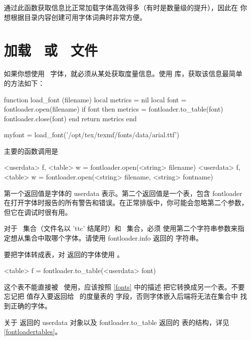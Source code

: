 通过此函数获取信息比正常加载字体高效得多（有时是数量级的提升），因此在
你想根据目录内容创建可用字体词典时非常方便。

\section{加载 \OPENTYPE\ 或 \TRUETYPE\ 文件}

\topicindex {\OPENTYPE}
\topicindex {\TRUETYPE}


如果你想使用 \OPENTYPE\ 字体，就必须从某处获取度量信息。使用
 库，获取该信息最简单的方法如下：

\begin{typing}
function load_font (filename)
  local metrics = nil
  local font = fontloader.open(filename)
  if font then
     metrics = fontloader.to_table(font)
     fontloader.close(font)
  end
  return metrics
end

myfont = load_font('/opt/tex/texmf/fonts/data/arial.ttf')
\end{typing}

主要的函数调用是

\begin{typing}
<userdata> f, <table> w = fontloader.open(<string> filename)
<userdata> f, <table> w = fontloader.open(<string> filename, <string> fontname)
\end{typing}

第一个返回值是字体的 userdata 表示。第二个返回值是一个表，包含 fontloader
在打开字体时报告的所有警告和错误。在正常排版中，你可能会忽略第二个参数，
但它在调试时很有用。

对于 \TRUETYPE\ 集合（文件名以 'ttc' 结尾时）和 \DFONT\ 集合，必须
使用第二个字符串参数来指定想从集合中取哪个字体。请使用 \type
{fontloader.info} 返回的  字符串。

要把字体转成表，对  返回的字体使用
。

\begin{typing}
<table> f = fontloader.to_table(<userdata> font)
\end{typing}

这个表不能直接被 \LUATEX\ 使用，应该按照 \ref{fonts} 中的描述
把它转换成另一个表。不要忘记把  值存入要返回给
\LUATEX\ 的度量表的  字段，否则字体嵌入后端将无法在集合中
找到正确的字体。

关于  返回的 userdata 对象以及 \type
{fontloader.to_table} 返回的  表的结构，详见
\ref{fontloadertables}。

